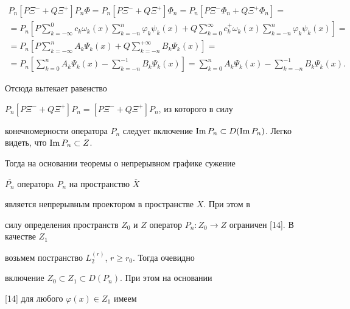 \begin{multline*}


P_n[P\Xi^-+Q\Xi^+]P_n\Phi=P_n[P\Xi^-+Q\Xi^+]\Phi_n=P_n[


P\Xi^-\Phi_n+Q\Xi^+\Phi_n]= \\


%


=P_n\left[P\sum\limits_{k=-\infty}^0


c_k\omega_k(x)\sum\limits_{k=-n}^n


\varphi_k\psi_k(x)+Q\sum\limits_{k=0}^\infty


c_k^+\omega_k(x)\sum\limits_{k=-n}^n


\varphi_k\psi_k(x)\right]= \\


%


=P_n\left[P\sum\limits_{k=-\infty}^n


A_k\Psi_k(x)+Q\sum\limits_{k=-n}^{+\infty} B_k\Psi_k(x)\right]= \\


%


=P_n\left[\sum\limits_{k=0}^n A_k\Psi_k(x)-\sum\limits_{k=-n}^{-1}


B_k\Psi_k(x)\right]= \sum\limits_{k=0}^n


A_k\Psi_k(x)-\sum\limits_{k=-n}^{-1} B_k\Psi_k(x).


\end{multline*}


Отсюда вытекает равенство


$P_n[P\Xi^-+Q\Xi^+]P_n=[P\Xi^-+Q\Xi^+]P_n$, из которого в силу


конечномерности оператора $P_n$ следует включение $\im 


P_n\subset D(\im  P_n)$. Легко видеть, что $\im  P_n\subset Z$.


Тогда на основании теоремы о непрерывном графике сужение


$\overline{P_n}$ операторa $P_n$ на пространство $\overline{X}$


является непрерывным проектором в пространстве $X$. При этом в


силу определения пространств $Z_0$ и $Z$ оператор $P_n: 


Z_0\rightarrow Z$ ограничен [14]. В качестве $Z_1$


возьмем постранство $L_2^{(r)}$, $r\geqslant r_0$. Тогда очевидно


включение $Z_0\subset Z_1\subset D(P_n)$. При этом на основании


[14] для любого $\varphi(x) \in Z_1$ имеем


